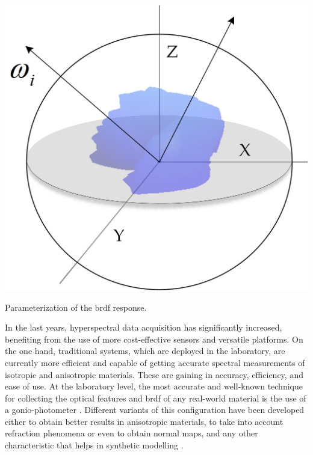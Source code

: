 \begin{marginfigure}[-1.2cm]
	\includegraphics{figs/fundamentals/brdf_wi_wo.png}
	\caption{Parameterization of the \acrshort{brdf} response.}
	\label{fig:brdf_wi_wo}
\end{marginfigure}

In the last years, hyperspectral data acquisition has significantly increased, benefiting from the use of more cost-effective sensors and versatile platforms. On the one hand, traditional systems, which are deployed in the laboratory, are currently more efficient and capable of getting accurate spectral measurements of isotropic and anisotropic materials. These are gaining in accuracy, efficiency, and ease of use. At the laboratory level, the most accurate and well-known technique for collecting the optical features and \acrshort{brdf} of any real-world material is the use of a gonio-photometer \cite{riviere_multispectral_2012}. Different variants of this configuration have been developed either to obtain better results in anisotropic materials, to take into account refraction phenomena or even to obtain normal maps, and any other characteristic that helps in synthetic modelling \cite{tunwattanapong_acquiring_2013, chen_reflectance_2014}. 


